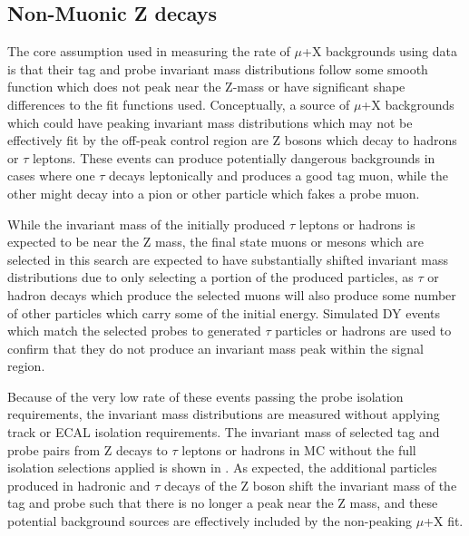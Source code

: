 \subsection{Non-Muonic Z decays}
The core assumption used in measuring the rate of $\mu$+X backgrounds using data is that their tag and probe invariant mass distributions follow some smooth function which does not peak near the Z-mass or have significant shape differences to the fit functions used.
Conceptually, a source of $\mu$+X backgrounds which could have peaking invariant mass distributions which may not be effectively fit by the off-peak control region are Z bosons which decay to hadrons or $\tau$ leptons.
These events can produce potentially dangerous backgrounds in cases where one $\tau$ decays leptonically and produces a good tag muon, while the other might decay into a pion or other particle which fakes a probe muon. 

While the invariant mass of the initially produced $\tau$ leptons or hadrons is expected to be near the Z mass, the final state muons or mesons which are selected in this search are expected to have substantially shifted invariant mass distributions due to only selecting a portion of the produced particles, as $\tau$ or hadron decays which produce the selected muons will also produce some number of other particles which carry some of the initial energy.
Simulated DY events which match the selected probes to generated $\tau$ particles or hadrons are used to confirm that they do not produce an invariant mass peak within the signal region.

Because of the very low rate of these events passing the probe isolation requirements, the invariant mass distributions are measured without applying track or ECAL isolation requirements.
The invariant mass of selected tag and probe pairs from Z decays to $\tau$ leptons or hadrons in MC without the full isolation selections applied is shown in .
As expected, the additional particles produced in hadronic and $\tau$ decays of the Z boson shift the invariant mass of the tag and probe such that there is no longer a peak near the Z mass, and these potential background sources are effectively included by the non-peaking $\mu$+X fit.

